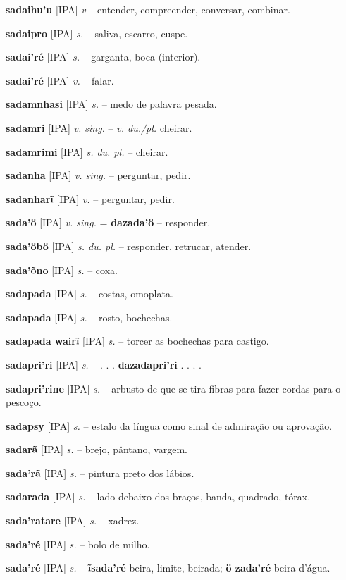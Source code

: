 \textbf{sadaihu'u} [IPA] \textit{v} -- entender, compreender, conversar, combinar.

\textbf{sadaipro} [IPA] \textit{s.} -- saliva, escarro, cuspe.

\textbf{sadai'ré} [IPA] \textit{s.} -- garganta, boca (interior).

\textbf{sadai'ré} [IPA] \textit{v.} -- falar.

\textbf{sadamnhasi} [IPA] \textit{s.} -- medo de palavra pesada.

\textbf{sadamri} [IPA] \textit{v. sing.} -- \textit{v. du./pl.} cheirar.

\textbf{sadamrimi} [IPA] \textit{s. du. pl.} -- cheirar.

\textbf{sadanha} [IPA] \textit{v. sing.} -- perguntar, pedir.

\textbf{sadanharĩ} [IPA] \textit{v.} -- perguntar, pedir.

\textbf{sada'ö} [IPA] \textit{v. sing.} = \textbf{dazada'ö} -- responder.

\textbf{sada'öbö} [IPA] \textit{s. du. pl.} -- responder, retrucar, atender.

\textbf{sada'õno} [IPA] \textit{s.} -- coxa.

\textbf{sadapada} [IPA] \textit{s.} -- costas, omoplata.

\textbf{sadapada} [IPA] \textit{s.} -- rosto, bochechas.

\textbf{sadapada wairĩ} [IPA] \textit{s.} -- torcer as bochechas para castigo.

\textbf{sadapri'ri} [IPA] \textit{s.} -- . . . \textbf{dazadapri'ri} . . . .

\textbf{sadapri'rine} [IPA] \textit{s.} -- arbusto de que se tira fibras para fazer cordas para o pescoço.

\textbf{sadapsy} [IPA] \textit{s.} -- estalo da língua como sinal de admiração ou aprovação.

\textbf{sadarã} [IPA] \textit{s.} -- brejo, pântano, vargem.

\textbf{sada'rã} [IPA] \textit{s.} -- pintura preto dos lábios.

\textbf{sadarada} [IPA] \textit{s.} -- lado debaixo dos braços, banda, quadrado, tórax.

\textbf{sada'ratare} [IPA] \textit{s.} -- xadrez.

\textbf{sada'ré} [IPA] \textit{s.} -- bolo de milho.

\textbf{sada'ré} [IPA] \textit{s.} -- \textbf{ĩsada'ré} beira, limite, beirada; \textbf{ö zada'ré} beira-d'água.

